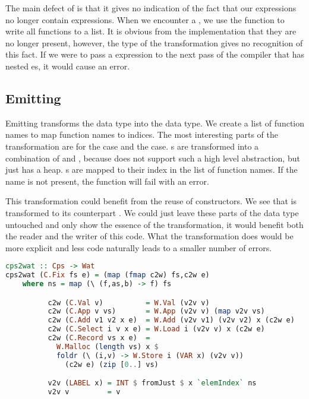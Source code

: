{The main defect of  is that it gives no indication of the fact that our  expressions no longer contain  expressions. When we encounter a , we use the  function to write all functions to a list. It is obvious from the implementation that they are no longer present, however, the type  of the transformation gives no recognition of this fact. If we were to pass a  expression to the next pass of the compiler that has nested es, it would cause an error.

\subsection{\label{section:emit}Emitting}
Emitting transforms the  data type into the  data type. We create a list of function names  to map function names to indices. The most interesting parts of the transformation are for the  case and the  case. s are transformed into a combination of  and , because  does not support such a high level abstraction, but just has a heap. s are mapped to their index in the list of function names. If the name is not present, the function will fail with an error.

This transformation could benefit from the reuse of constructors. We see that  is transformed to its  counterpart . We could just leave these parts of the data type untouched and only show the essence of the transformation, it would benefit both the reader and the writer of this code. What the transformation does would be more explicit and less code naturally leads to a smaller number of errors.

\begin{lstlisting}[language=Haskell]
cps2wat :: Cps -> Wat
cps2wat (C.Fix fs e) = (map (fmap c2w) fs,c2w e)
    where ns = map (\ (f,as,b) -> f) fs

          c2w (C.Val v)          = W.Val (v2v v)
          c2w (C.App v vs)       = W.App (v2v v) (map v2v vs)
          c2w (C.Add v1 v2 x e)  = W.Add (v2v v1) (v2v v2) x (c2w e)
          c2w (C.Select i v x e) = W.Load i (v2v v) x (c2w e)
          c2w (C.Record vs x e)  =
            W.Malloc (length vs) x $
            foldr (\ (i,v) -> W.Store i (VAR x) (v2v v))
              (c2w e) (zip [0..] vs)

          v2v (LABEL x) = INT $ fromJust $ x `elemIndex` ns
          v2v v         = v
\end{lstlisting}

}
